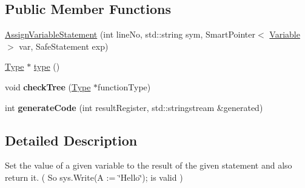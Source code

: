 \subsection*{Public Member Functions}
\begin{DoxyCompactItemize}
\item 
\hyperlink{class_scribble_core_1_1_assign_variable_statement_a4409d9bc843516435a02a9ce55041346}{Assign\-Variable\-Statement} (int line\-No, std\-::string sym, Smart\-Pointer$<$ \hyperlink{class_scribble_core_1_1_variable}{Variable} $>$ var, Safe\-Statement exp)
\item 
\hyperlink{class_scribble_core_1_1_type}{Type} $\ast$ \hyperlink{class_scribble_core_1_1_assign_variable_statement_a809f7220af1536d0912a68e6880e5c81}{type} ()
\item 
\hypertarget{class_scribble_core_1_1_assign_variable_statement_a9ad4d49c7f0691aad680cb30711cd149}{void {\bfseries check\-Tree} (\hyperlink{class_scribble_core_1_1_type}{Type} $\ast$function\-Type)}\label{class_scribble_core_1_1_assign_variable_statement_a9ad4d49c7f0691aad680cb30711cd149}

\item 
\hypertarget{class_scribble_core_1_1_assign_variable_statement_a2cd7a3d55227d0feaf7b622c02b521cb}{int {\bfseries generate\-Code} (int result\-Register, std\-::stringstream \&generated)}\label{class_scribble_core_1_1_assign_variable_statement_a2cd7a3d55227d0feaf7b622c02b521cb}

\end{DoxyCompactItemize}


\subsection{Detailed Description}
Set the value of a given variable to the result of the given statement and also return it. ( So sys.\-Write(A \-:= \char`\"{}\-Hello\char`\"{}); is valid ) 

